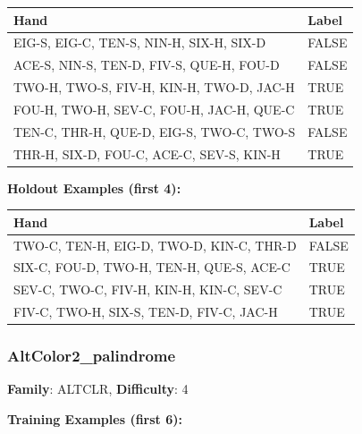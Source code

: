 \documentclass[10pt,a4paper]{article}
\begin{document}
\begin{small}
\begin{tabular}{p{8cm}l}
\toprule
Hand & Label \\
\midrule
EIG-S, EIG-C, TEN-S, NIN-H, SIX-H, SIX-D & \textcolor{negative}{FALSE} \\
ACE-S, NIN-S, TEN-D, FIV-S, QUE-H, FOU-D & \textcolor{negative}{FALSE} \\
TWO-H, TWO-S, FIV-H, KIN-H, TWO-D, JAC-H & \textcolor{positive}{TRUE} \\
FOU-H, TWO-H, SEV-C, FOU-H, JAC-H, QUE-C & \textcolor{positive}{TRUE} \\
TEN-C, THR-H, QUE-D, EIG-S, TWO-C, TWO-S & \textcolor{negative}{FALSE} \\
THR-H, SIX-D, FOU-C, ACE-C, SEV-S, KIN-H & \textcolor{positive}{TRUE} \\
\bottomrule
\end{tabular}
\end{small}

\textbf{Holdout Examples (first 4):}

\begin{small}
\begin{tabular}{p{8cm}l}
\toprule
Hand & Label \\
\midrule
TWO-C, TEN-H, EIG-D, TWO-D, KIN-C, THR-D & \textcolor{negative}{FALSE} \\
SIX-C, FOU-D, TWO-H, TEN-H, QUE-S, ACE-C & \textcolor{positive}{TRUE} \\
SEV-C, TWO-C, FIV-H, KIN-H, KIN-C, SEV-C & \textcolor{positive}{TRUE} \\
FIV-C, TWO-H, SIX-S, TEN-D, FIV-C, JAC-H & \textcolor{positive}{TRUE} \\
\bottomrule
\end{tabular}
\end{small}

\vspace{0.5cm}

\subsubsection{AltColor2\_palindrome}

\textbf{Family}: ALTCLR, \textbf{Difficulty}: 4

\textbf{Training Examples (first 6):}
\end{document}
